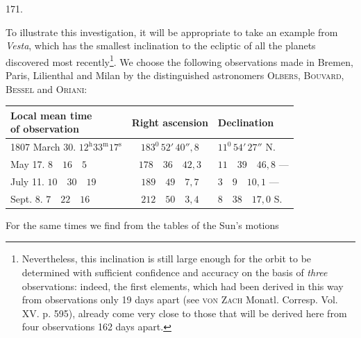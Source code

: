 \par{}\medskip
\begin{center}\hypertarget{native-236-article171}{}171.\end{center}
To illustrate this investigation, it will be appropriate to take an example from \emph{Vesta}, which has the smallest inclination to the ecliptic of all the planets discovered most recently\footnote{Nevertheless, this inclination is still large enough for the orbit to be determined with sufficient confidence and accuracy on the basis of \emph{three} observations: indeed, the first elements, which had been derived in this way from observations only 19 days apart (see \textsc{von Zach} Monatl. Corresp. Vol. XV. p. 595), already come very close to those that will be derived here from four observations 162 days apart.}. We choose the following observations made in Bremen, Paris, Lilienthal and Milan by the distinguished astronomers \textsc{Olbers}, \textsc{Bouvard}, \textsc{Bessel} and \textsc{Oriani}:
\begin{center}
\begingroup\fontsize{9}{11}\selectfont\setlength{\tabcolsep}{3pt}
\begin{tabular}{|l|c|l|}
\hline
\shortstack{Local mean time\\of observation} & Right ascension & Declination\\\hline
1807 March 30. $12^{\mathrm h}33^{\mathrm m}17^{\mathrm s}$ & $183^0\,52'\,40''{,}8$ & $11^0\,54'\,27''$ N.\\
\phantom{1807 }May 17. $8\quad16\quad5$ & $178\quad36\quad42{,}3$ & $11\quad39\quad46{,}8$ —\\
\phantom{1807 }July 11. $10\quad30\quad19$ & $189\quad49\quad7{,}7$ & $3\quad9\quad10{,}1$ —\\
\phantom{1807 }Sept. 8. $7\quad22\quad16$ & $212\quad50\quad3{,}4$ & $8\quad38\quad17{,}0$ S.\\\hline
\end{tabular}\endgroup
\end{center}
For the same times we find from the tables of the Sun's motions
